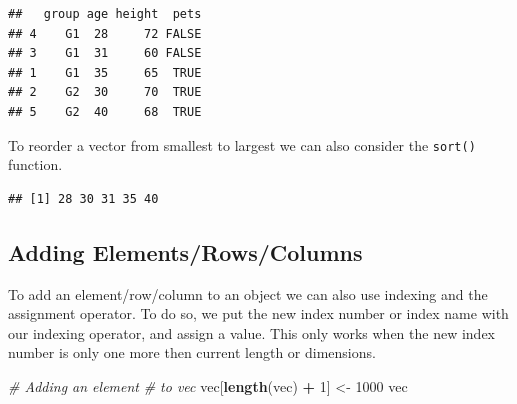 \documentclass[
]{book}
\newenvironment{Shaded}{\begin{snugshade}}{\end{snugshade}}
\newcommand{\CommentTok}[1]{\textcolor[rgb]{0.56,0.35,0.01}{\textit{#1}}}
\newcommand{\DecValTok}[1]{\textcolor[rgb]{0.00,0.00,0.81}{#1}}
\newcommand{\KeywordTok}[1]{\textcolor[rgb]{0.13,0.29,0.53}{\textbf{#1}}}
\newcommand{\NormalTok}[1]{#1}
\newcommand{\OperatorTok}[1]{\textcolor[rgb]{0.81,0.36,0.00}{\textbf{#1}}}
\newcommand{\StringTok}[1]{\textcolor[rgb]{0.31,0.60,0.02}{#1}}
\begin{document}
\begin{Shaded}
\end{Shaded}

\begin{verbatim}
##   group age height  pets
## 4    G1  28     72 FALSE
## 3    G1  31     60 FALSE
## 1    G1  35     65  TRUE
## 2    G2  30     70  TRUE
## 5    G2  40     68  TRUE
\end{verbatim}

To reorder a vector from smallest to largest we can also consider the \texttt{sort()} function.

\begin{Shaded}
\end{Shaded}

\begin{verbatim}
## [1] 28 30 31 35 40
\end{verbatim}

\hypertarget{adding-elementsrowscolumns}{%
\subsection{Adding Elements/Rows/Columns}\label{adding-elementsrowscolumns}}

To add an element/row/column to an object we can also use indexing and the assignment operator. To do so, we put the new index number or index name with our indexing operator, and assign a value. This only works when the new index number is only one more then current length or dimensions.

\begin{Shaded}
\begin{Highlighting}[]
\CommentTok{# Adding an element}
\CommentTok{# to vec}
\NormalTok{vec[}\KeywordTok{length}\NormalTok{(vec) }\OperatorTok{+}\StringTok{ }\DecValTok{1}\NormalTok{] <-}\StringTok{ }\DecValTok{1000}
\NormalTok{vec}
\end{Highlighting}
\end{Shaded}
\end{document}
